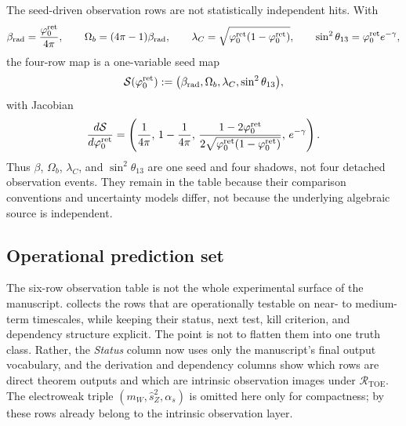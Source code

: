 \begin{remark}
The seed-driven observation rows are not statistically independent hits. With
\[
\beta_{\mathrm{rad}}=\frac{\varphi_0^{\mathrm{ret}}}{4\pi},
\qquad
\Omega_b=(4\pi-1)\beta_{\mathrm{rad}},
\qquad
\lambda_C=\sqrt{\varphi_0^{\mathrm{ret}}(1-\varphi_0^{\mathrm{ret}})},
\qquad
\sin^2\theta_{13}=\varphi_0^{\mathrm{ret}} e^{-\gamma},
\]
the four-row map is a one-variable seed map
\[
\mathcal S(\varphi_0^{\mathrm{ret}}):=\bigl(\beta_{\mathrm{rad}},\Omega_b,\lambda_C,\sin^2\theta_{13}\bigr),
\]
with Jacobian
\[
\frac{d\mathcal S}{d\varphi_0^{\mathrm{ret}}}
=
\left(
\frac{1}{4\pi},
\,
1-\frac{1}{4\pi},
\,
\frac{1-2\varphi_0^{\mathrm{ret}}}{2\sqrt{\varphi_0^{\mathrm{ret}}(1-\varphi_0^{\mathrm{ret}})}},
\,
e^{-\gamma}
\right).
\]
Thus $\beta$, $\Omega_b$, $\lambda_C$, and $\sin^2\theta_{13}$ are one seed and four shadows,
not four detached observation events. They remain in the table because their comparison
conventions and uncertainty models differ, not because the underlying algebraic source is
independent.
\end{remark}

\subsection{Operational prediction set}

The six-row observation table is not the whole experimental surface of the manuscript.
 collects the rows that are operationally testable on near-
to medium-term timescales, while keeping their status, next test, kill criterion, and dependency
structure explicit. The point is not to flatten them into one truth class. Rather, the
\emph{Status} column now uses only the manuscript's final output vocabulary, and the derivation
and dependency columns show which rows are direct theorem outputs and which are intrinsic
observation images under $\mathcal R_{\mathrm{TOE}}$. The electroweak triple
$(m_W,\hat s_Z^2,\alpha_s)$ is omitted here only for compactness; by
 these rows already belong to the
intrinsic observation layer.

